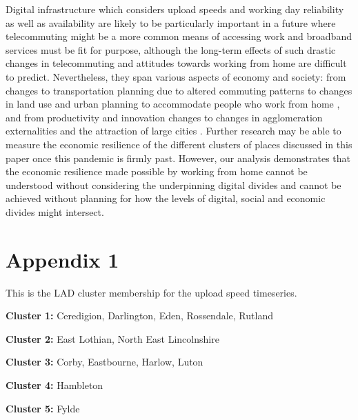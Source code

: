 \documentclass[]{interact}
\theoremstyle{plain}%
\theoremstyle{definition}
\theoremstyle{remark}
\begin{document}
Digital infrastructure which considers upload speeds and working day
reliability as well as availability are likely to be particularly
important in a future where telecommuting might be a more common means
of accessing work and broadband services must be fit for purpose,
although the long-term effects of such drastic changes in telecommuting
and attitudes towards working from home are difficult to predict.
Nevertheless, they span various aspects of economy and society: from
changes to transportation planning due to altered commuting patterns to
changes in land use and urban planning to accommodate people who work
from home \citep{BUDNITZ2020102713, ELLDER2020102777}, and from
productivity and innovation changes to changes in agglomeration
externalities and the attraction of large cities \citep{econobs}.
Further research may be able to measure the economic resilience of the
different clusters of places discussed in this paper once this pandemic
is firmly past. However, our analysis demonstrates that the economic
resilience made possible by working from home cannot be understood
without considering the underpinning digital divides and cannot be
achieved without planning for how the levels of digital, social and
economic divides might intersect.

\hypertarget{appendix1}{%
\section*{Appendix 1}\label{appendix1}}

This is the LAD cluster membership for the upload speed timeseries.

\textbf{Cluster 1: } Ceredigion, Darlington, Eden, Rossendale, Rutland

\textbf{Cluster 2: } East Lothian, North East Lincolnshire

\textbf{Cluster 3: } Corby, Eastbourne, Harlow, Luton

\textbf{Cluster 4: } Hambleton

\textbf{Cluster 5: } Fylde
\end{document}
